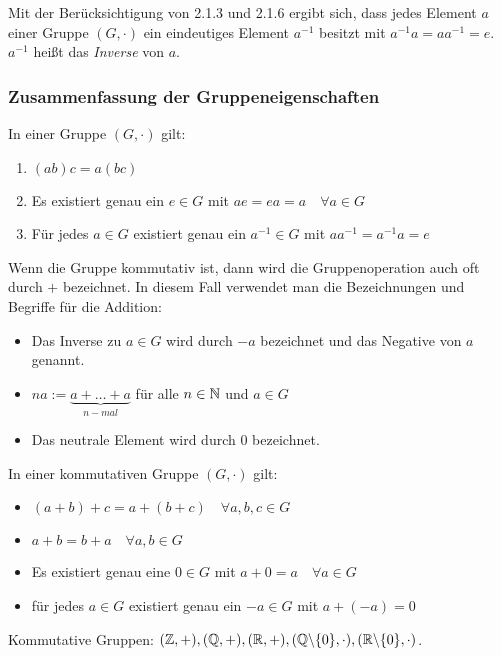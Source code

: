\noindent Mit der Berücksichtigung von 2.1.3 und 2.1.6 ergibt sich, dass jedes Element $ a $ einer Gruppe $ (G,\cdot) $ ein eindeutiges Element $ a^{-1} $ besitzt mit $ a^{-1}a = aa^{-1} = e $. $ a^{-1} $ heißt das \emph{Inverse} von $ a $.

\subsubsection{Zusammenfassung der Gruppeneigenschaften}

In einer Gruppe $ (G, \cdot ) $ gilt:
\begin{enumerate}
	\item
		$ (ab)c = a(bc) $
	\item
		Es existiert genau ein $  e \in G $ mit $ ae = ea = a \quad \forall a \in G $
	\item
		Für jedes $ a \in G $ existiert genau ein $  a^{-1} \in G $ mit $ aa^{-1} = a^{-1}a = e $
\end{enumerate}
Wenn die Gruppe kommutativ ist, dann wird die Gruppenoperation auch oft durch $ + $ bezeichnet. In diesem Fall verwendet man die Bezeichnungen und Begriffe für die Addition:
\begin{itemize}
	\item Das Inverse zu $ a \in G $ wird durch $ -a $ bezeichnet und das Negative von $ a $ genannt.
	\item $ na := \underbrace{a+ \ldots + a}_{n-mal} $ für alle $ n \in \mathbb N $ und $ a \in G $
	\item Das neutrale Element wird durch $ 0 $ bezeichnet.
\end{itemize}
In einer kommutativen Gruppe $ (G, \cdot) $ gilt:
\begin{itemize}
	\item
		$ (a+b)+c = a+(b+c) \quad \forall a,b,c \in G $
	\item
		$ a+b = b+a \quad \forall a,b \in G $
	\item
		Es existiert genau eine $ 0 \in G $ mit $ a+0 = a \quad \forall a \in G $
	\item
		für jedes $ a \in G $ existiert genau ein $ -a \in G $ mit $ a+ (-a) = 0 $
\end{itemize}

\begin{bsp}
	Kommutative Gruppen: \hfill $ (\mathbb{Z}, +), \hfill (\mathbb{Q}, +), \hfill (\mathbb{R}, +), \hfill (\mathbb{Q} \backslash \{0\}, \cdot ), \hfill (\mathbb{R} \backslash \{0\}, \cdot ) $.
\end{bsp}

